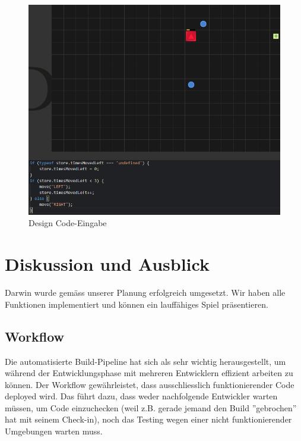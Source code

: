 \documentclass[11pt,a4paper,titlepage]{article}
\begin{document}
\begin{figure}[H]
	\centering
	\includegraphics[width=\textwidth]{game2.png}
	\caption{Design Code-Eingabe}
	\label{code-eingabe}
\end{figure}

\newpage

\section{Diskussion und Ausblick}
%

Darwin wurde gemäss unserer Planung erfolgreich umgesetzt. Wir haben alle Funktionen implementiert und können ein lauffähiges Spiel präsentieren.

\subsection{Workflow}

Die automatisierte Build-Pipeline hat sich als sehr wichtig herausgestellt, um während der Entwicklungsphase mit mehreren Entwicklern effizient arbeiten zu können. Der Workflow gewährleistet, dass ausschliesslich funktionierender Code deployed wird. Das führt dazu, dass weder nachfolgende Entwickler warten müssen, um Code einzuchecken (weil z.B. gerade jemand den Build ''gebrochen'' hat mit seinem Check-in), noch das Testing wegen einer nicht funktionierender Umgebungen warten muss.
\end{document}
